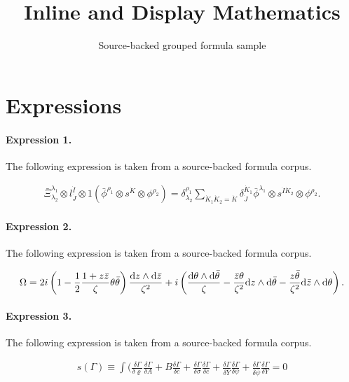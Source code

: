 \documentclass[11pt]{article}
\title{Inline and Display Mathematics}
\author{Source-backed grouped formula sample}
\date{}
\begin{document}
\maketitle
\section{Expressions}
\paragraph{Expression 1.} The following expression is taken from a source-backed formula corpus.

\begin{align*}\bar{\Xi}^{\lambda_1}_{\lambda_2} \otimes l^{\dot{I}}_{\dot{J}} \otimes 1 \left( \bar{\phi}^{\rho_1} \otimes s^{\dot{K}} \otimes \phi^{\rho_2} \right) = \delta^{\rho_1}_{\lambda_2} \sum_{\dot{K}_1\dot{K}_2 = \dot{K}} \delta^{\dot{K}_1}_{\dot{J}} \bar{\phi}^{\lambda_1} \otimes s^{\dot{I} \dot{K}_2} \otimes \phi^{\rho_2}. \end{align*}

\paragraph{Expression 2.} The following expression is taken from a source-backed formula corpus.

\begin{align*}\Omega=2i\left(1-\frac{1}{2}\frac{1+z\bar{z}}{\zeta}\theta\bar{\theta}\right)\frac{{\rm d}z\wedge {\rm d}\bar{z}}{\zeta^2}+i\left(\frac{{\rm d}\theta \wedge {\rm d}\bar{\theta}}{\zeta}-\frac{\bar{z}\theta}{\zeta^2}{\rm d}z \wedge {\rm d}\bar{\theta}-\frac{z\bar{\theta}}{\zeta^2}{\rm d}\bar{z} \wedge {\rm d}\theta\right).\end{align*}

\paragraph{Expression 3.} The following expression is taken from a source-backed formula corpus.

\begin{align*}s(\Gamma)\equiv\int(\frac{\delta\Gamma}{\delta\varrho}\frac{\delta\Gamma}{\delta A}+B \frac {\delta\Gamma}{\delta\bar{c} }+\frac{\delta\Gamma}{\delta\sigma}\frac{\delta\Gamma}{\delta c}+\frac{\delta\Gamma}{\delta\bar{Y}}\frac{\delta\Gamma}{\delta\psi}+\frac{\delta\Gamma}{\delta\bar{\psi}}\frac{\delta\Gamma}{\delta Y}=0\end{align*}
\end{document}
